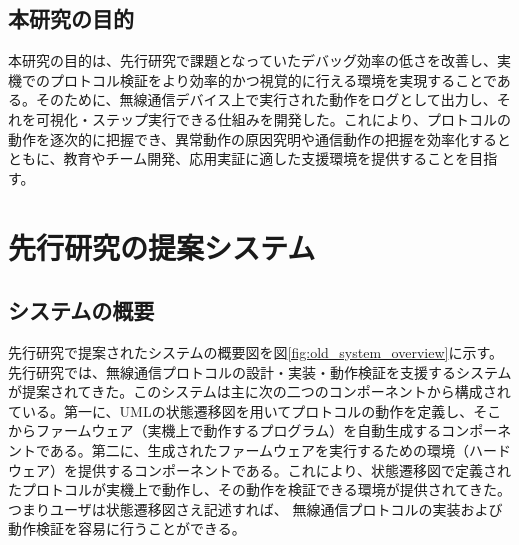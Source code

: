 \documentclass[12pt]{jreport}
\begin{document}
\section{本研究の目的}
\begin{par}
本研究の目的は、先行研究で課題となっていたデバッグ効率の低さを改善し、実機でのプロトコル検証をより効率的かつ視覚的に行える環境を実現することである。そのために、無線通信デバイス上で実行された動作をログとして出力し、それを可視化・ステップ実行できる仕組みを開発した。これにより、プロトコルの動作を逐次的に把握でき、異常動作の原因究明や通信動作の把握を効率化するとともに、教育やチーム開発、応用実証に適した支援環境を提供することを目指す。
\end{par}



\chapter{先行研究の提案システム}
\section{システムの概要}
\begin{par}
先行研究で提案されたシステムの概要図を図\ref{fig:old_system_overview}に示す。 
先行研究では、無線通信プロトコルの設計・実装・動作検証を支援するシステムが提案されてきた。このシステムは主に次の二つのコンポーネントから構成されている。第一に、UMLの状態遷移図を用いてプロトコルの動作を定義し、そこからファームウェア（実機上で動作するプログラム）を自動生成するコンポーネントである。第二に、生成されたファームウェアを実行するための環境（ハードウェア）を提供するコンポーネントである。これにより、状態遷移図で定義されたプロトコルが実機上で動作し、その動作を検証できる環境が提供されてきた。つまりユーザは状態遷移図さえ記述すれば、 無線通信プロトコルの実装および動作検証を容易に行うことができる。
\end{par}
\end{document}
